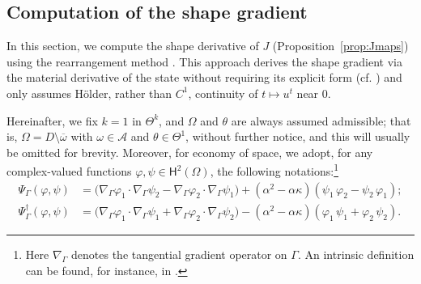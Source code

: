 \documentclass[a4paper,11pt]{article}
\newcommand{\vect}[1]{\boldsymbol{\mathbf{#1}}}
\newcommand{\tannabla}{\nabla_{\varGamma}}
\newcommand{\sfTheta}{\Theta}
\newcommand{\HH}{\vect{\mathsf{H}}}
\begin{document}
\subsection{Computation of the shape gradient}
\label{subsec:shape_derivative_of_the_cost_using_the_Eulerian_derivatives}
In this section, we compute the shape derivative of $J$ (Proposition~\ref{prop:Jmaps}) using the rearrangement method \cite{IKP2008}. 
This approach derives the shape gradient via the material derivative of the state without requiring its explicit form (cf. \cite{Rabago2023b}) and only assumes H\"older, rather than ${C}^{1}$, continuity of $t \mapsto u^{t}$ near $0$.

Hereinafter, we fix $k = 1$ in $\sfTheta^{k}$, and $\varOmega$ and $\theta$ are always assumed admissible; that is, $\varOmega = D \setminus \overline{\omega}$ with $\omega \in \mathcal{A}$ and $\theta \in \sfTheta^{1}$, without further notice, and this will usually be omitted for brevity.
Moreover, for economy of space, we adopt, for any complex-valued functions $\varphi, \psi \in \HH^{2}(\varOmega)$, the following notations:\footnote{Here $\tannabla$ denotes the tangential gradient operator on $\varGamma$. An intrinsic definition can be found, for instance, in \cite[Chap.~5, Sec.~5.1, p.~492]{DelfourZolesio2011}.}
\begin{align*}
\Psi_{\varGamma}(\varphi, \psi) 
&= \big( \tannabla \varphi_{1} \cdot \tannabla \psi_{2} 
- \tannabla \varphi_{2} \cdot \tannabla \psi_{1} \big)
+ (\alpha^{2} - \alpha \kappa)(\psi_{1}\, \varphi_{2} - \psi_{2}\, \varphi_{1});\\
%
\Psi^{\dagger}_{\varGamma}(\varphi, \psi) 
&= \big( \tannabla \varphi_{1} \cdot \tannabla \psi_{1} 
+ \tannabla \varphi_{2} \cdot \tannabla \psi_{2} \big)
- (\alpha^{2} - \alpha \kappa)(\varphi_{1}\, \psi_{1} + \varphi_{2}\, \psi_{2}).
\end{align*}
% 
\end{document}
